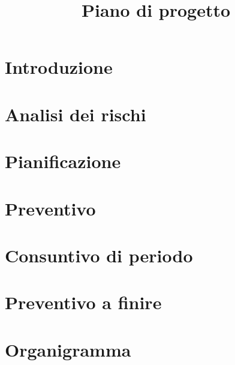 \documentclass{article}
\title{Piano di progetto}
\begin{document}


\section{Introduzione}%
\label{sec:introduzione}

\newpage
\section{Analisi dei rischi}%
\label{sec:analisi_dei_rischi}

\newpage
\section{Pianificazione}%
\label{sec:pianificazione}

\newpage
\section{Preventivo}%
\label{sec:preventivo}

\newpage
\section{Consuntivo di periodo}%
\label{sec:consuntivo_di_periodo}

\section{Preventivo a finire}%
\label{sec:preventivo_a_finire}

\label{sec:attualizzazione_dei_rischi}

\newpage
\appendix
\section{Organigramma}%
\label{sec:organigramma}

\end{document}

